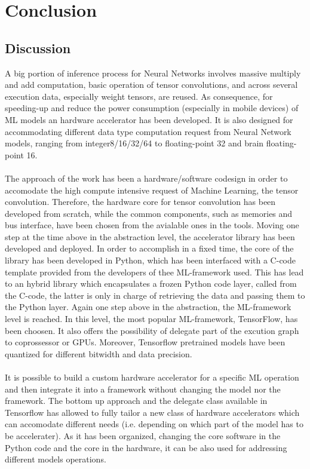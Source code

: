\chapter{Conclusion}

\section{Discussion}
A big portion of inference process for Neural Networks involves massive multiply and add computation, basic operation of tensor convolutions, and across several execution data, especially weight tensors, are reused.
As consequence, for speeding-up and reduce the power consumption (especially in mobile devices) of ML models an hardware accelerator has been developed. 
 It is also designed for accommodating different data type computation request from Neural Network models, ranging from integer8/16/32/64 to floating-point 32 and brain floating-point 16.\\\\

The approach of the work has been a hardware/software codesign in order to accomodate the high compute intensive request of Machine Learning, the tensor convolution. Therefore, the hardware core for tensor convolution has been developed from scratch, while the common components, such as memories and bus interface, have been  chosen from the avialable ones in the tools.
Moving one step at the time above in the abstraction level, the accelerator library has been developed and deployed. In order to accomplish in a fixed time, the core of the library has been developed in Python, which has been interfaced with a C-code template provided from the developers of thee ML-framework used. This has lead to an hybrid library which encapsulates a frozen Python code layer, called from the C-code, the latter is only in charge of retrieving the data and passing them to the Python layer.
Again one step above in the abstraction, the ML-framework level is reached. In this level, the most popular ML-framework, TensorFlow, has been choosen. It also offers the possibility of delegate part of the excution graph to coprossessor or GPUs. Moreover, Tensorflow pretrained models have been quantized for different bitwidth and data precision.\\\\


It is possible to build a custom hardware accelerator for a specific ML operation and then integrate it into a framework without changing the model nor the framework.
The bottom up approach and the delegate class available in Tensorflow has allowed to fully tailor a new class of hardware accelerators which can accomodate different needs (i.e. depending on which part of the model has to be accelerater). As it has been organized, changing the core software in the Python code and the core in the hardware, it can be also used for addressing different models operations. 

